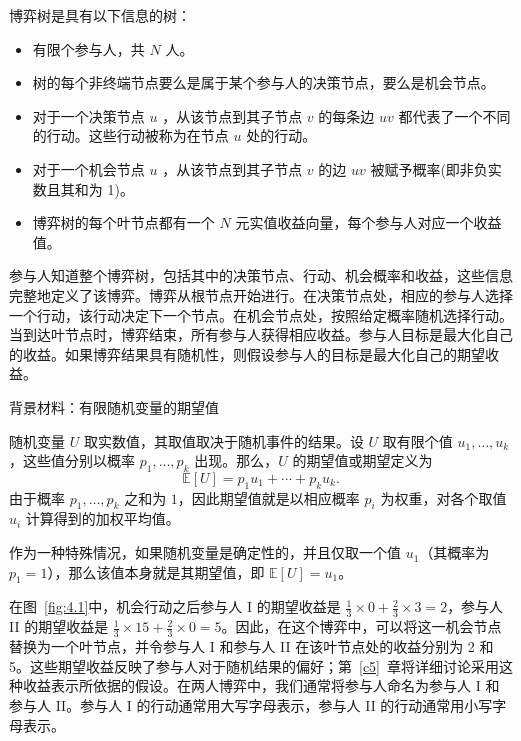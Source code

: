 \begin{definition}\label{def:4.2}
博弈树是具有以下信息的树：

\begin{itemize}
\item 有限个参与人，共 \(N\) 人。
\item 树的每个非终端节点要么是属于某个参与人的决策节点，要么是机会节点。
\item 对于一个决策节点 \(u\) ，从该节点到其子节点 \(v\) 的每条边 \({uv}\) 都代表了一个不同的行动。这些行动被称为在节点 \(u\) 处的行动。
\item 对于一个机会节点 \(u\) ，从该节点到其子节点 \(v\) 的边 \({uv}\) 被赋予概率(即非负实数且其和为 1)。
\item 博弈树的每个叶节点都有一个 \(N\) 元实值收益向量，每个参与人对应一个收益值。
\end{itemize}
\end{definition}

参与人知道整个博弈树，包括其中的决策节点、行动、机会概率和收益，这些信息完整地定义了该博弈。博弈从根节点开始进行。在决策节点处，相应的参与人选择一个行动，该行动决定下一个节点。在机会节点处，按照给定概率随机选择行动。当到达叶节点时，博弈结束，所有参与人获得相应收益。参与人目标是最大化自己的收益。如果博弈结果具有随机性，则假设参与人的目标是最大化自己的期望收益。


\begin{mybox}{背景材料：有限随机变量的期望值}
\setlength{\parindent}{2em}

随机变量 \(U\) 取实数值，其取值取决于随机事件的结果。设 \(U\) 取有限个值 \(u_1,\ldots,u_k\)，这些值分别以概率 \(p_1,\ldots,p_k\) 出现。那么，\(U\) 的期望值或期望定义为
\begin{equation}\label{eq:4.1}
\mathbb{E}[U] = p_1u_1+\cdots+p_ku_k.
\end{equation}
由于概率 \(p_1,\ldots,p_k\) 之和为 \(1\)，因此期望值就是以相应概率 \(p_i\) 为权重，对各个取值 \(u_i\) 计算得到的加权平均值。

作为一种特殊情况，如果随机变量是确定性的，并且仅取一个值 \(u_1\)（其概率为 \(p_1=1\)），那么该值本身就是其期望值，即 \(\mathbb{E}[U]=u_1\)。

\end{mybox}

在图~\ref{fig:4.1}中，机会行动之后参与人 I 的期望收益是 \(\frac{1}{3}\times0 + \frac{2}{3}\times3 = 2\)，参与人 II 的期望收益是 \(\frac{1}{3}\times{15} + \frac{2}{3}\times0 = 5\)。因此，在这个博弈中，可以将这一机会节点替换为一个叶节点，并令参与人 I 和参与人 II 在该叶节点处的收益分别为 2 和 5。这些期望收益反映了参与人对于随机结果的偏好；第~\ref{c5}~章将详细讨论采用这种收益表示所依据的假设。在两人博弈中，我们通常将参与人命名为参与人 I 和参与人 II。参与人 I 的行动通常用大写字母表示，参与人 II 的行动通常用小写字母表示。

